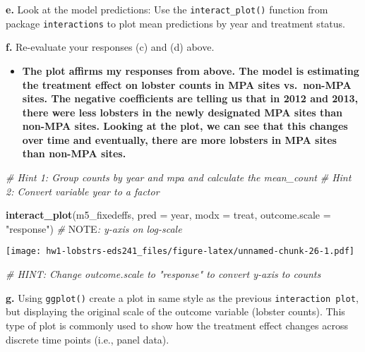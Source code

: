 \documentclass[
]{article}
\newenvironment{Shaded}{\begin{snugshade}}{\end{snugshade}}
\newcommand{\AlertTok}[1]{\textcolor[rgb]{0.94,0.16,0.16}{#1}}
\newcommand{\AttributeTok}[1]{\textcolor[rgb]{0.13,0.29,0.53}{#1}}
\newcommand{\CommentTok}[1]{\textcolor[rgb]{0.56,0.35,0.01}{\textit{#1}}}
\newcommand{\FunctionTok}[1]{\textcolor[rgb]{0.13,0.29,0.53}{\textbf{#1}}}
\newcommand{\NormalTok}[1]{#1}
\newcommand{\StringTok}[1]{\textcolor[rgb]{0.31,0.60,0.02}{#1}}
\providecommand{\tightlist}{%
  \setlength{\itemsep}{0pt}\setlength{\parskip}{0pt}}
\begin{document}
\textbf{e.} Look at the model predictions: Use the
\texttt{interact\_plot()} function from package \texttt{interactions} to
plot mean predictions by year and treatment status.

\textbf{f.} Re-evaluate your responses (c) and (d) above.

\begin{itemize}
\tightlist
\item
  \textbf{The plot affirms my responses from above. The model is
  estimating the treatment effect on lobster counts in MPA sites
  vs.~non-MPA sites. The negative coefficients are telling us that in
  2012 and 2013, there were less lobsters in the newly designated MPA
  sites than non-MPA sites. Looking at the plot, we can see that this
  changes over time and eventually, there are more lobsters in MPA sites
  than non-MPA sites.}
\end{itemize}

\begin{Shaded}
\begin{Highlighting}[]
\CommentTok{\# Hint 1: Group counts by \textasciigrave{}year\textasciigrave{} and \textasciigrave{}mpa\textasciigrave{} and calculate the \textasciigrave{}mean\_count\textasciigrave{}}
\CommentTok{\# Hint 2: Convert variable \textasciigrave{}year\textasciigrave{} to a factor}

\FunctionTok{interact\_plot}\NormalTok{(m5\_fixedeffs, }\AttributeTok{pred =}\NormalTok{ year, }\AttributeTok{modx =}\NormalTok{ treat,}
              \AttributeTok{outcome.scale =} \StringTok{"response"}\NormalTok{)  }\CommentTok{\# }\AlertTok{NOTE}\CommentTok{: y{-}axis on log{-}scale}
\end{Highlighting}
\end{Shaded}

\texttt{[image: hw1-lobstrs-eds241\_files/figure-latex/unnamed-chunk-26-1.pdf]}

\begin{Shaded}
\begin{Highlighting}[]
\CommentTok{\# HINT: Change \textasciigrave{}outcome.scale\textasciigrave{} to "response" to convert y{-}axis to counts}
\end{Highlighting}
\end{Shaded}

\textbf{g.} Using \texttt{ggplot()} create a plot in same style as the
previous \texttt{interaction\ plot}, but displaying the original scale
of the outcome variable (lobster counts). This type of plot is commonly
used to show how the treatment effect changes across discrete time
points (i.e., panel data).
\end{document}
